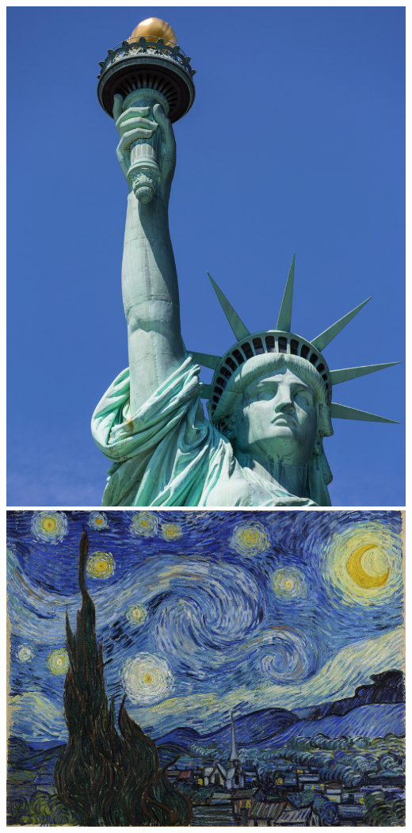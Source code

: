 \documentclass[11pt,class=report,crop=false]{standalone}
\begin{document}
\begin{center}
\includegraphics[scale=\myscale,scale=0.15]{figures/statue-of-liberty_resized.jpg}
\qquad\qquad
\includegraphics[scale=\myscale,scale=0.18]{figures/Van_Gogh_nuit.jpg}
\end{center}
\end{document}
